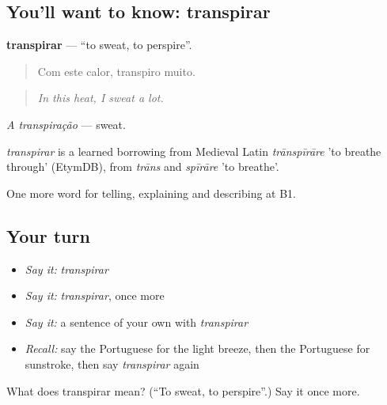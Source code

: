 \subsection*{You'll want to know: transpirar}
\textbf{transpirar} — \textquotedblleft{}to sweat, to perspire\textquotedblright{}.

\begin{quote}
Com este calor, transpiro muito.
\end{quote}

\begin{quote}
\emph{In this heat, I sweat a lot.}
\end{quote}

\emph{A transpiração} — sweat.

\begin{cousinweb}
\emph{transpirar} is a learned borrowing from Medieval Latin \emph{trānspīrāre} 'to breathe through' (EtymDB), from \emph{trāns} and \emph{spīrāre} 'to breathe'.
\end{cousinweb}

\begin{grammarlens}[title={What you've built}]
One more word for telling, explaining and describing at B1.
\end{grammarlens}

\subsection*{Your turn}
\begin{itemize}
\raggedright
  \item \emph{Say it:} \emph{transpirar}
  \item \emph{Say it:} \emph{transpirar}, once more
  \item \emph{Say it:} a sentence of your own with \emph{transpirar}
  \item \emph{Recall:} say the Portuguese for the light breeze, then the Portuguese for sunstroke, then say \emph{transpirar} again
\end{itemize}

\begin{tcolorbox}[breakable,colback=teal!4,colframe=teal!35!black,title={Before you move on}]
What does transpirar mean? (\textquotedblleft{}To sweat, to perspire\textquotedblright{}.) Say it once more.
\end{tcolorbox}
